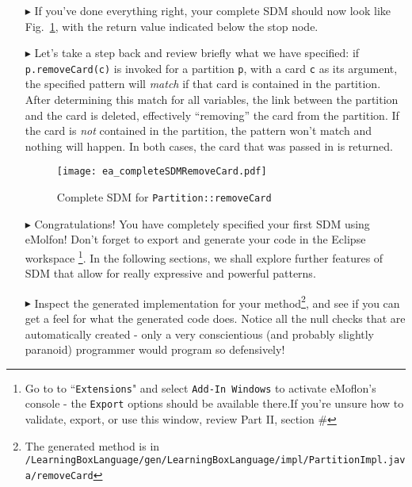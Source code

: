 \begin{itemize}
\item[$\blacktriangleright$] If you've done everything right, your complete SDM should now look like Fig.~\ref{fig:sdm_complete_control_flow}, with the return
value indicated below the stop node.

\item[$\blacktriangleright$] Let's take a step back and review briefly what we have specified:  if \texttt{p.remove\-Card(c)} is invoked for a partition
\texttt{p}, with a card \texttt{c} as its argument, the specified pattern will \emph{match} if that card is contained in the partition. After determining this
match for all variables, the link between the partition and the card is deleted, effectively ``removing'' the card from the partition. If the card is \emph{not}
contained in the partition, the pattern won't match and nothing will happen. In both cases, the card that was passed in is returned.

\vspace{1cm}
\begin{figure}[htbp]
\begin{center}
  \texttt{[image: ea\_completeSDMRemoveCard.pdf]}
  \caption{Complete SDM for \texttt{Partition::removeCard}}  
  \label{fig:sdm_complete_control_flow}
\end{center}
\end{figure}

\pagebreak

\item[$\blacktriangleright$] Congratulations! You have completely specified your first SDM using eMolfon! Don't forget to export and generate your code in the
Eclipse workspace \footnote{Go to to ``\texttt{Extensions}" and select \texttt{Add-In Windows} to activate eMoflon's console - the \texttt{Export} options
should be available there.If you're unsure how to validate, export, or use this window, review Part II, section \#}. In the following sections, we shall explore
further features of SDM that allow for really expressive and powerful patterns.

\item[$\blacktriangleright$] Inspect the generated implementation for your method\footnote{The generated method is in
\texttt{/Learning\-Box\-Language/\-gen/\-Learning\-Box\-Language/\-impl/\-Partition\-Impl.java/\-remove\-Card}}, and see if you can get a feel for what the
generated code does. Notice all the null checks that are automatically created - only a very conscientious (and probably slightly paranoid) programmer would
program so defensively!


\end{itemize}
